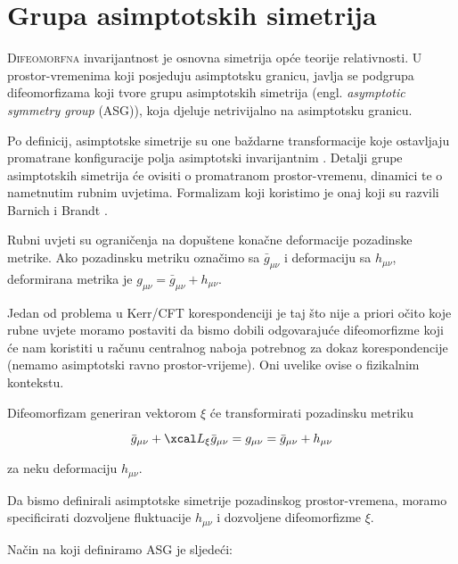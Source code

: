 \chapter{Grupa asimptotskih simetrija}\label{cha:ASG}

\lettrine[lines=4]{D} {ifeomorfna} invarijantnost je osnovna simetrija opće teorije relativnosti. U prostor-vremenima koji posjeduju asimptotsku granicu, javlja se podgrupa difeomorfizama koji tvore grupu asimptotskih simetrija (engl. \textit{asymptotic symmetry group} (ASG)), koja djeluje netrivijalno na asimptotsku granicu.

\noindent Po definicij, asimptotske simetrije su one baždarne transformacije koje ostavljaju promatrane konfiguracije polja asimptotski invarijantnim \citep{Brown:1986nw}. Detalji grupe asimptotskih simetrija će ovisiti o promatranom prostor-vremenu, dinamici te o nametnutim rubnim uvjetima. Formalizam koji koristimo je onaj koji su razvili Barnich i Brandt \citep{Barnich:2001jy}.

Rubni uvjeti su ograničenja na dopuštene konačne deformacije pozadinske metrike. Ako pozadinsku metriku označimo sa $\bar{g}_{\mu\nu}$ i deformaciju sa $h_{\mu\nu}$,  deformirana metrika je $g_{\mu\nu}=\bar{g}_{\mu\nu}+h_{\mu\nu}$.

Jedan od problema u Kerr/CFT korespondenciji je taj što nije a priori očito koje rubne uvjete moramo postaviti da bismo dobili odgovarajuće difeomorfizme koji će nam koristiti u računu centralnog naboja potrebnog za dokaz korespondencije (nemamo asimptotski ravno prostor-vrijeme). Oni uvelike ovise o fizikalnim kontekstu. 

\noindent Difeomorfizam generiran vektorom $\xi$ će transformirati pozadinsku metriku

\begin{equation*}
\bar{g}_{\mu\nu}+\Lie_\xi \bar{g}_{\mu\nu}=g_{\mu\nu}=\bar{g}_{\mu\nu}+h_{\mu\nu}
\end{equation*}

\noindent za neku deformaciju $h_{\mu\nu}$.

Da bismo definirali asimptotske simetrije pozadinskog prostor-vremena, moramo specificirati dozvoljene fluktuacije $h_{\mu\nu}$ i dozvoljene difeomorfizme $\xi$.

Način na koji definiramo ASG je sljedeći:

